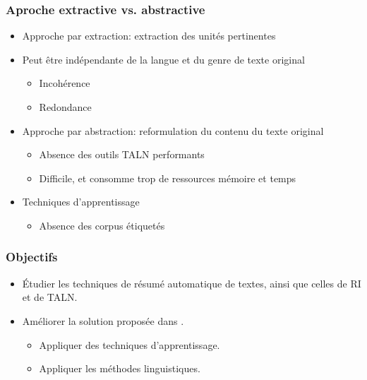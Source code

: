\documentclass{beamer}
\begin{document}
\begin{frame}
\frametitle{Aproche extractive vs. abstractive}

\begin{itemize}
\item Approche par extraction: extraction des unités pertinentes

\item Peut être indépendante de la langue et du genre de texte original
\begin{itemize}
\item Incohérence
\item Redondance
\end{itemize}
\end{itemize}

\begin{itemize}
\item Approche par abstraction: reformulation du contenu du texte original
\begin{itemize}
\item Absence des outils TALN performants
\item Difficile, et consomme trop de ressources mémoire et temps
\end{itemize}
\end{itemize}

\begin{itemize}
\item Techniques d'apprentissage
\begin{itemize}
\item Absence des corpus étiquetés
\end{itemize}
\end{itemize}

\end{frame}

\begin{frame}
\frametitle{Objectifs}

\begin{itemize}
\item \'Etudier les techniques de résumé automatique de textes, ainsi que celles de RI et de TALN.
\item Améliorer la solution proposée dans \cite{13-aries-al}.
\begin{itemize}
\item Appliquer des techniques d'apprentissage.
\item Appliquer les méthodes linguistiques.
\end{itemize}
\end{itemize}
\end{frame}
\end{document}
